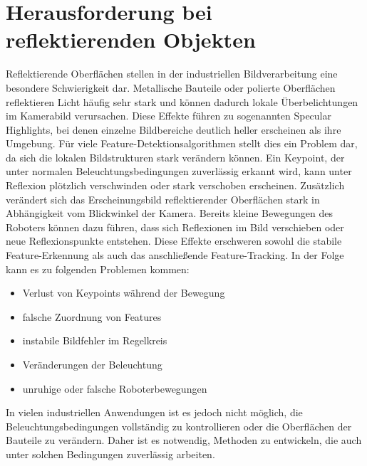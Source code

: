 \section{Herausforderung bei reflektierenden Objekten}
\label{sec:HerausforderungbeireflektierendenObjekten}
Reflektierende Oberflächen stellen in der industriellen Bildverarbeitung eine besondere Schwierigkeit dar. Metallische Bauteile oder polierte Oberflächen reflektieren Licht häufig sehr stark und können dadurch lokale Überbelichtungen im Kamerabild verursachen. Diese Effekte führen zu sogenannten Specular Highlights, bei denen einzelne Bildbereiche deutlich heller erscheinen als ihre Umgebung.
Für viele Feature-Detektionsalgorithmen stellt dies ein Problem dar, da sich die lokalen Bildstrukturen stark verändern können. Ein Keypoint, der unter normalen Beleuchtungsbedingungen zuverlässig erkannt wird, kann unter Reflexion plötzlich verschwinden oder stark verschoben erscheinen.
Zusätzlich verändert sich das Erscheinungsbild reflektierender Oberflächen stark in Abhängigkeit vom Blickwinkel der Kamera. Bereits kleine Bewegungen des Roboters können dazu führen, dass sich Reflexionen im Bild verschieben oder neue Reflexionspunkte entstehen.
Diese Effekte erschweren sowohl die stabile Feature-Erkennung als auch das anschließende Feature-Tracking. In der Folge kann es zu folgenden Problemen kommen:
\begin{itemize}
	\item Verlust von Keypoints während der Bewegung
	\item falsche Zuordnung von Features
	\item instabile Bildfehler im Regelkreis
	\item Veränderungen der Beleuchtung
	\item unruhige oder falsche Roboterbewegungen
\end{itemize}

In vielen industriellen Anwendungen ist es jedoch nicht möglich, die Beleuchtungsbedingungen vollständig zu kontrollieren oder die Oberflächen der Bauteile zu verändern. Daher ist es notwendig, Methoden zu entwickeln, die auch unter solchen Bedingungen zuverlässig arbeiten.

\newpage
